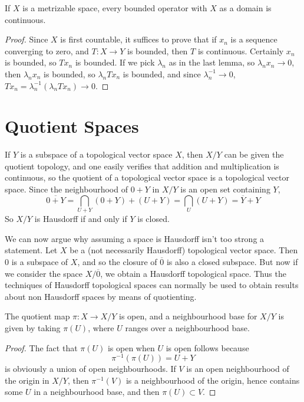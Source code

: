 \begin{theorem}
    If $X$ is a metrizable space, every bounded operator with $X$ as a domain is continuous.
\end{theorem}
\begin{proof}
    Since $X$ is first countable, it suffices to prove that if $x_n$ is a sequence converging to zero, and $T: X \to Y$ is bounded, then $T$ is continuous. Certainly $x_n$ is bounded, so $Tx_n$ is bounded. If we pick $\lambda_n$ as in the last lemma, so $\lambda_n x_n \to 0$, then $\lambda_n x_n$ is bounded, so $\lambda_n Tx_n$ is bounded, and since $\lambda_n^{-1} \to 0$, $Tx_n = \lambda_n^{-1} (\lambda_n Tx_n) \to 0$.
\end{proof}

\section{Quotient Spaces}

If $Y$ is a subspace of a topological vector space $X$, then $X/Y$ can be given the quotient topology, and one easily verifies that addition and multiplication is continuous, so the quotient of a topological vector space is a topological vector space. Since the neighbourhood of $0 + Y$ in $X/Y$ is an open set containing $Y$,
%
\[ \overline{0 + Y} = \bigcap_{U + Y} (0 + Y) + (U + Y) = \bigcap_{U} (U + Y) = \overline{Y} + Y \]
%
So $X/Y$ is Hausdorff if and only if $Y$ is closed.

We can now argue why assuming a space is Hausdorff isn't too strong a statement. Let $X$ be a (not necessarily Hausdorff) topological vector space. Then $0$ is a subspace of $X$, and so the closure of $\overline{0}$ is also a closed subspace. But now if we consider the space $X/\overline{0}$, we obtain a Hausdorff topological space. Thus the techniques of Hausdorff topological spaces can normally be used to obtain results about non Hausdorff spaces by means of quotienting.

\begin{theorem}
    The quotient map $\pi: X \to X/Y$ is open, and a neighbourhood base for $X/Y$ is given by taking $\pi(U)$, where $U$ ranges over a neighbourhood base.
\end{theorem}
\begin{proof}
    The fact that $\pi(U)$ is open when $U$ is open follows because
    \[ \pi^{-1}(\pi(U)) = U + Y \]
    is obviously a union of open neighbourhoods. If $V$ is an open neighbourhood of the origin in $X/Y$, then $\pi^{-1}(V)$ is a neighbourhood of the origin, hence contains some $U$ in a neighbourhood base, and then $\pi(U) \subset V$.
\end{proof}

